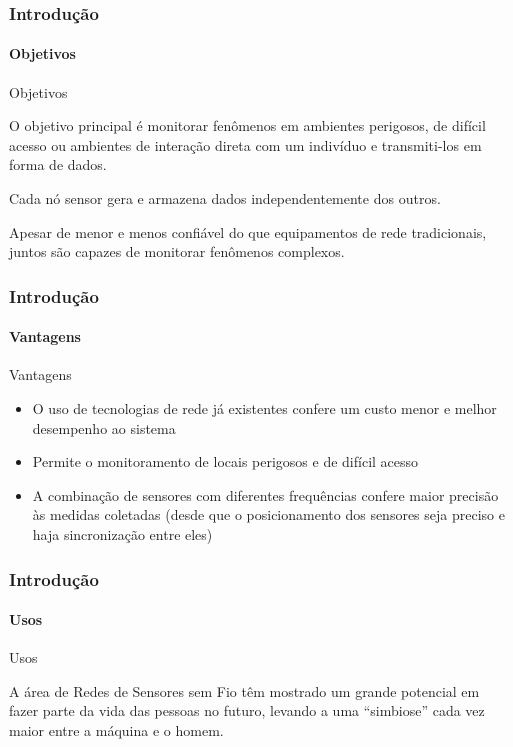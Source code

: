 \documentclass[notes]{beamer}
\begin{document}
\begin{frame}
\label{slide_7}
\frametitle{Introdução}
\framesubtitle{Objetivos}

\begin{block}{Objetivos}

O objetivo principal é monitorar fenômenos em ambientes perigosos, de difícil acesso ou ambientes de interação direta com um indivíduo e transmiti-los em forma de dados. 
\end{block} \pause

\begin{block}

Cada nó sensor gera e armazena dados independentemente dos outros.

\end{block} \pause

\begin{block}

Apesar de menor e menos confiável do que equipamentos de rede tradicionais, juntos são capazes de monitorar fenômenos complexos. 

\end{block}

\end{frame}

\begin{frame}
\label{slide_8}
\frametitle{Introdução}
\framesubtitle{Vantagens}

\begin{block}{Vantagens}

\begin{itemize}

\item O uso de tecnologias de rede já existentes confere um custo menor e melhor desempenho ao sistema \pause

\item Permite o monitoramento de locais perigosos e de difícil acesso \pause

\item A combinação de sensores com diferentes frequências confere maior precisão às medidas coletadas (desde que o posicionamento dos sensores seja preciso e haja sincronização entre eles) 

\end{itemize}

\end{block}

\end{frame}

\begin{frame}
\label{slide_9}
\frametitle{Introdução}
\framesubtitle{Usos}

\begin{block}{Usos}

A área de Redes de Sensores sem Fio têm mostrado um grande potencial em fazer parte da vida das pessoas no futuro, levando a uma “simbiose” cada vez maior entre a máquina e o homem\cite{Redes_Sensores}. 

\end{block}

\end{frame}
\end{document}

